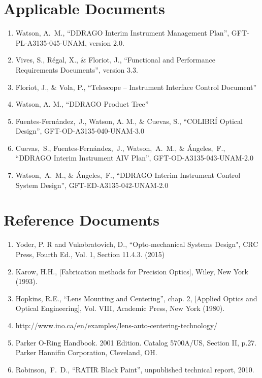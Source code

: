 \documentclass{article}
\begin{document}
\clearpage

\section*{Applicable Documents}

\begin{enumerate}[label={AD\arabic*}]
\item \label{management-plan} Watson, A.~M., “DDRAGO Interim Instrument Management Plan”, GFT-PL-A3135-045-UNAM, version 2.0.
\item \label{FPRD} Vives, S., R\'egal, X., \& Floriot, J., “Functional and Performance Requirements Documents”, version 3.3.
\item \label{telescope-icd} Floriot, J., \& Vola, P., “Telescope – Instrument
Interface Control Document”
\item \label{product-tree} Watson, A. M., “DDRAGO Product Tree”
\item \label{optics} Fuentes-Fernández,~J., Watson, A. M., \& Cuevas, S., “COLIBRÍ Optical Design”, GFT-OD-A3135-040-UNAM-3.0
\item \label{aiv} Cuevas,~S., Fuentes-Fernández,~J., Watson,~A.~M., \& Ángeles,~F., “DDRAGO Interim Instrument AIV Plan”, GFT-OD-A3135-043-UNAM-2.0
\item \label{control} Watson,~A.~M., \& Ángeles,~F., “DDRAGO Interim Instrument
Control System Design”, GFT-ED-A3135-042-UNAM-2.0

\end{enumerate}

\section*{Reference Documents}

\begin{enumerate}[label={RD\arabic*}]
\item \label{yoder15} Yoder, P. R and Vukobratovich, D., ``Opto-mechanical Systems Design", CRC Press, Fourth Ed., Vol. 1, Section 11.4.3. (2015)

\item \label{karow} Karow, H.H., [Fabrication methods for Precision Optics], Wiley, New York (1993).

\item \label{hopkins} Hopkins, R.E., “Lens Mounting and Centering”, chap. 2, [Applied Optics and Optical Engineering], Vol. VIII, Academic Press, New York (1980).
\item \label{ino} http://www.ino.ca/en/examples/lens-auto-centering-technology/

\item \label{parker} Parker O-Ring Handbook. 2001 Edition. Catalog 5700A/US, Section II, p.27.
Parker Hannifin Corporation, Cleveland, OH.

\item \label{black} Robinson,~F.~D., “RATIR Black Paint”, unpublished technical report, 2010.

\end{enumerate}
\end{document}
